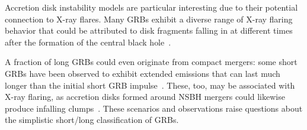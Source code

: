 Accretion disk instability models are particular interesting due to their potential connection to X-ray flares.
Many GRBs exhibit a diverse range of X-ray flaring behavior that could be attributed to disk fragments falling in at different times after the formation of the central black hole~\citep{Perna_2006, Dallosso_2017}.

A fraction of long GRBs could even originate from compact mergers: some short GRBs have been observed to exhibit extended emissions that can last much longer than the initial short GRB impulse~\citep{Norris_2006, vanPutten_2014}.
These, too, may be associated with X-ray flaring, as accretion disks formed around NSBH mergers could likewise produce infalling clumps~\citep{Mu_2018}.
These scenarios and observations raise questions about the simplistic short/long classification of GRBs.
